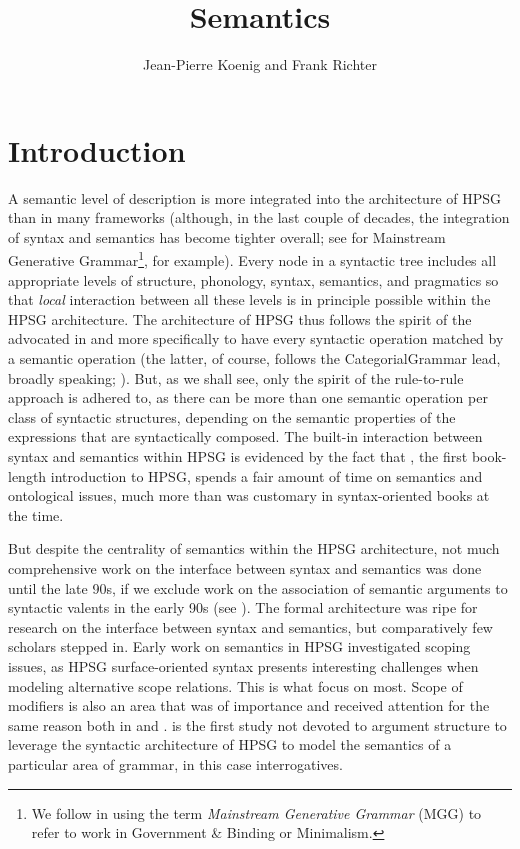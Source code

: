 \documentclass[output=paper,biblatex,babelshorthands,newtxmath,draftmode,colorlinks,citecolor=brown]{langscibook}
\author{Jean-Pierre Koenig\orcid{0000-0002-5431-5978}\affiliation{University at Buffalo} and Frank Richter\orcid{0000-0003-1929-5489}\affiliation{Goethe Universität Frankfurt}}
\title{Semantics}
\begin{document}
\maketitle
\label{chap-semantics}

\section{Introduction} 

A semantic level of description is more integrated into the architecture of HPSG
than in many frameworks (although, in the last couple of decades, the integration of syntax and
semantics has become tighter overall; see \citealt{HeimandKratzer1998} for Mainstream Generative
Grammar\footnote{ We follow \citet[]{CJ2005a} in using the term \emph{Mainstream Generative
    Grammar} (MGG) to refer to work in Government \& Binding or Minimalism.}, for example). Every
node in a syntactic tree includes all appropriate levels of structure, phonology, syntax, semantics,
and pragmatics so that \emph{local} interaction between all these levels is in principle possible
within the HPSG architecture. The architecture of HPSG thus follows the spirit of the
 advocated in \citet{Bach1976} and more specifically
\citet{KleinandSag1985} to have every syntactic operation matched by a semantic operation (the
latter, of course, follows the Categorial\indexcg Grammar lead, broadly speaking;
\citealt{Ajdukiewicz35a-u,Pollard84a-u,Steedman2000a-u}). But, as we shall see, only the spirit of
the rule-to-rule approach is adhered to, as there can be more than one semantic operation per class
of syntactic structures, depending on the semantic properties of the expressions that are
syntactically composed. The built-in interaction between syntax and semantics within HPSG is
evidenced by the fact that \citet{PollardandSag1987}, the first book-length introduction to HPSG,
spends a fair amount of time on semantics and ontological issues, much more than was customary in
syntax-oriented books at the time.

But despite the centrality of semantics within the HPSG architecture, not much comprehensive work on
the interface between syntax and semantics was done until the late 90s, if we exclude work on the
association of semantic arguments to syntactic valents in the early 90s (see
). The formal architecture was ripe for research on the interface between
syntax and semantics, but comparatively few scholars stepped in.  Early work on semantics in HPSG
investigated scoping issues, as HPSG surface-oriented syntax presents interesting challenges when
modeling alternative scope relations. This is what \citet{PollardandSag1987, PollardandSag1994}
focus on most. Scope of modifiers is also an area that was of importance and received attention for
the same reason both in \citet{PollardandSag1994} and \citet{Kasper1997}. 
is the first study not devoted to argument structure to leverage the syntactic architecture of HPSG
to model the semantics of a particular area of grammar, in this case interrogatives.
\end{document}
